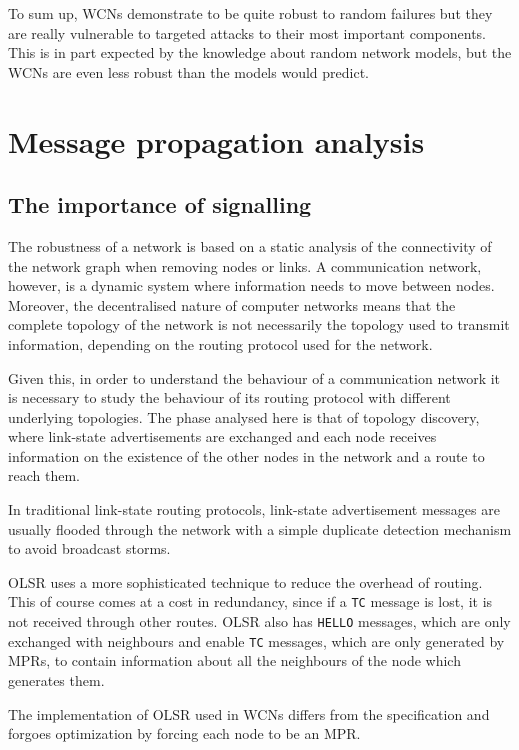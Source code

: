 \documentclass[a4paper,11pt,twoside,openright]{memoir}
\begin{document}
To sum up, WCNs demonstrate to be quite robust to random failures but
they are really vulnerable to targeted attacks to their most important
components. This is in part expected by the knowledge about
random network models, but the WCNs are even less robust than the models
would predict.

\chapter{Message propagation analysis}\label{message-propagation-analysis}

\section{The importance of signalling}\label{the-importance-of-signalling}

The robustness of a network is based on a static analysis of the
connectivity of the network graph when removing nodes or links. A
communication network, however, is a dynamic system where information
needs to move between nodes. Moreover, the decentralised nature of
computer networks means that the complete topology of the network is not
necessarily the topology used to transmit information, depending on the
routing protocol used for the network.

Given this, in order to understand the behaviour of a communication
network it is necessary to study the behaviour of its routing protocol
with different underlying topologies. The phase analysed here is that of
topology discovery, where link-state advertisements are exchanged and
each node receives information on the existence of the other nodes in
the network and a route to reach them.

In traditional link-state routing protocols, link-state advertisement
messages are usually flooded through the network with a simple duplicate
detection mechanism to avoid broadcast storms.

OLSR uses a more sophisticated technique to reduce the overhead of
routing. This of course comes at a cost in redundancy, since if a \texttt{TC}
message is lost, it is not received through other routes.
OLSR also has \texttt{HELLO} messages, which are only exchanged with
neighbours and enable \texttt{TC} messages, which are only generated by
MPRs, to contain information about all the neighbours of the node which
generates them.

The implementation of OLSR used in WCNs differs from the specification
and forgoes optimization by forcing each node to be an MPR.
\end{document}
